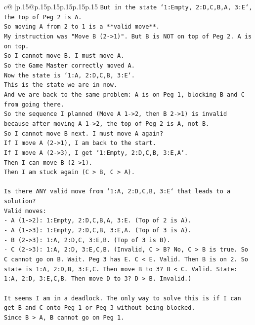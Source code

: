 \documentclass{article}
\begin{document}
{\begin{supertabular}{c@{$\;$}|p{.15\linewidth}@{}p{.15\linewidth}p{.15\linewidth}p{.15\linewidth}p{.15\linewidth}p{.15\linewidth}}
{{{\texttt{But in the state `1:Empty, 2:D,C,B,A, 3:E`, the top of Peg 2 is A.} \\
\texttt{So moving A from 2 to 1 is a **valid move**.} \\
\texttt{My instruction was "Move B (2{-}>1)". But B is NOT on top of Peg 2. A is on top.} \\
\texttt{So I cannot move B. I must move A.} \\
\texttt{So the Game Master correctly moved A.} \\
\texttt{Now the state is `1:A, 2:D,C,B, 3:E`.} \\
\texttt{This is the state we are in now.} \\
\texttt{And we are back to the same problem: A is on Peg 1, blocking B and C from going there.} \\
\texttt{So the sequence I planned (Move A 1{-}>2, then B 2{-}>1) is invalid because after moving A 1{-}>2, the top of Peg 2 is A, not B.} \\
\texttt{So I cannot move B next. I must move A again?} \\
\texttt{If I move A (2{-}>1), I am back to the start.} \\
\texttt{If I move A (2{-}>3), I get `1:Empty, 2:D,C,B, 3:E,A`.} \\
\texttt{Then I can move B (2{-}>1).} \\
\texttt{Then I am stuck again (C > B, C > A).} \\
\\ 
\texttt{Is there ANY valid move from `1:A, 2:D,C,B, 3:E` that leads to a solution?} \\
\texttt{Valid moves:} \\
\texttt{{-} A (1{-}>2): 1:Empty, 2:D,C,B,A, 3:E. (Top of 2 is A).} \\
\texttt{{-} A (1{-}>3): 1:Empty, 2:D,C,B, 3:E,A. (Top of 3 is A).} \\
\texttt{{-} B (2{-}>3): 1:A, 2:D,C, 3:E,B. (Top of 3 is B).} \\
\texttt{{-} C (2{-}>3): 1:A, 2:D, 3:E,C,B. (Invalid, C > B? No, C > B is true. So C cannot go on B. Wait. Peg 3 has E. C < E. Valid. Then B is on 2. So state is 1:A, 2:D,B, 3:E,C. Then move B to 3? B < C. Valid. State: 1:A, 2:D, 3:E,C,B. Then move D to 3? D > B. Invalid.)} \\
\\ 
\texttt{It seems I am in a deadlock. The only way to solve this is if I can get B and C onto Peg 1 or Peg 3 without being blocked.} \\
\texttt{Since B > A, B cannot go on Peg 1.} \\
}}}
\end{supertabular}}
\end{document}

